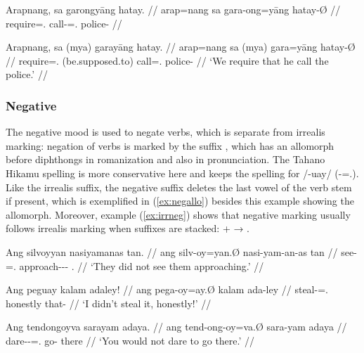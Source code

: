 \pex
\a\ljudge*\begingl
	\gla Arapnang, sa garongyāng hatay. //
	\glb arap=nang sa gara-ong=yāng hatay-Ø //
	\glc require=\Fpl{}.\Aarg{} \PatT{} call-\Irr{}=\TsgM{}.\Aarg{} 
		police-\Top{} //
\endgl

\a\label{ex:myashall}\begingl
	\gla Arapnang, sa {\normalfont (}mya{\normalfont )} garayāng hatay. //
	\glb arap=nang sa (mya) gara=yāng hatay-Ø //
	\glc require=\Fpl{}.\Aarg{} \PatT{} (be.supposed.to) 
		call=\TsgM{}.\Aarg{} police-\Top{} //
	\glft `We require that he call the police.' //
\endgl
\xe


\subsubsection{Negative}
\label{subsubsec:verbneg}

The negative mood is used to negate verbs, which is separate from irrealis
marking: negation of verbs is marked by the suffix , which has
an allomorph  before diphthongs in romanization and also in
pronunciation. The Tahano Hikamu spelling is more conservative here and keeps
the spelling   for /-uay/
(\mbox{-\Neg{}=\Fsg{}.\Top{}}). Like the irrealis suffix, the
negative suffix deletes the last vowel of the verb stem if present, which is
exemplified in (\ref{ex:negallo}) besides this example showing the 
allomorph. Moreover, example (\ref{ex:irrneg}) shows that negative marking
usually follows irrealis marking when suffixes are stacked:  +
 → .

\pex
\a\label{ex:negative}\begingl
	\gla Ang silvoyyan nasiyamanas tan. //
	\glb ang silv-oy=yan.Ø nasi-yam-an-as tan //
	\glc \AgtT{} see-\Neg{}=\TplM{}.\Top{} approach-\Ptcp{}-\Nmlz{}-\Parg{} 
		\TplM{}.\Gen{} //
	\glft `They did not see them approaching.' //
\endgl

\a\label{ex:negallo}\begingl
	\gla Ang peguay kalam adaley!  //
	\glb ang pega-oy=ay.Ø kalam ada-ley //
	\glc \AgtT{} steal-\Neg{}=\Fsg{}.\Top{} honestly that-\PargI{} //
	\glft `I didn't steal it, honestly!' //
\endgl

\a\label{ex:irrneg}\begingl
	\gla Ang tendongoyva sarayam adaya. //
	\glb ang tend-ong-oy=va.Ø sara-yam adaya //
	\glc \AgtT{} dare-\Irr{}-\Neg{}=\Ssg{}.\Top{} go-\Ptcp{} there //
	\glft `You would not dare to go there.' //
\endgl

